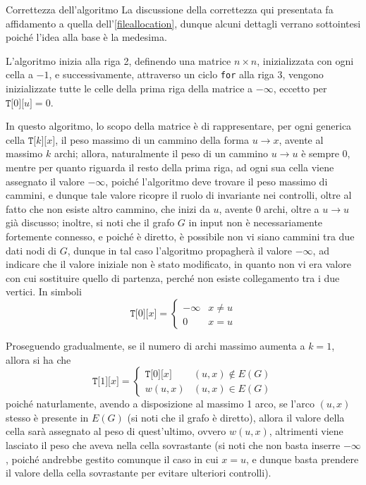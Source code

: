 \documentclass[a4paper, 12pt]{report}
\begin{document}
    \begin{framedobs}{Correttezza dell'algoritmo}
        La discussione della correttezza qui presentata fa affidamento a quella dell'\cref{fileallocation}, dunque alcuni dettagli verrano sottointesi poiché l'idea alla base è la medesima.

        L'algoritmo inizia alla riga 2, definendo una matrice $n \times n$, inizializzata con ogni cella a $-1$, e successivamente, attraverso un ciclo \texttt{for} alla riga 3, vengono inizializzate tutte le celle della prima riga della matrice a $- \infty$, eccetto per $\texttt{T[}0\texttt{][}u\texttt{]}=0$.

        In questo algoritmo, lo scopo della matrice è di rappresentare, per ogni generica cella $\texttt{T[}k\texttt{][}x\texttt{]}$, il peso massimo di un cammino della forma $u \rightarrow x$, avente al massimo $k$ archi; allora, naturalmente il peso di un cammino $u \rightarrow u$ è sempre 0, mentre per quanto riguarda il resto della prima riga, ad ogni sua cella viene assegnato il valore $- \infty$, poiché l'algoritmo deve trovare il peso massimo di cammini, e dunque tale valore ricopre il ruolo di invariante nei controlli, oltre al fatto che non esiste altro cammino, che inizi da $u$, avente 0 archi, oltre a $u \rightarrow u$ già discusso; inoltre, si noti che il grafo $G$ in input non è necessariamente fortemente connesso, e poiché è diretto, è possibile non vi siano cammini tra due dati nodi di $G$, dunque in tal caso l'algoritmo propagherà il valore $- \infty$, ad indicare che il valore iniziale non è stato modificato, in quanto non vi era valore con cui sostituire quello di partenza, perché non esiste collegamento tra i due vertici. In simboli $$\texttt{T[}0\texttt{][}x\texttt{]} = \left \{ \begin{array}{ll} - \infty & x \neq u \\ 0 & x = u \end{array} \right.$$

        Proseguendo gradualmente, se il numero di archi massimo aumenta a $k =1$, allora si ha che $$\texttt{T[}1\texttt{][}x\texttt{]} = \left \{ \begin{array}{ll} \texttt{T[}0\texttt{][}x\texttt{]} & (u, x) \notin E(G) \\ w(u, x) & (u, x) \in E(G) \end{array} \right .$$ poiché naturlamente, avendo a disposizione al massimo 1 arco, se l'arco $(u, x)$ stesso è presente in $E(G)$ (si noti che il grafo è diretto), allora il valore della cella sarà assegnato al peso di quest'ultimo, ovvero $w(u, x)$, altrimenti viene lasciato il peso che aveva nella cella sovrastante (si noti che non basta inserre $- \infty$, poiché andrebbe gestito comunque il caso in cui $x = u$, e dunque basta prendere il valore della cella sovrastante per evitare ulteriori controlli).


\end{framedobs}
\end{document}
